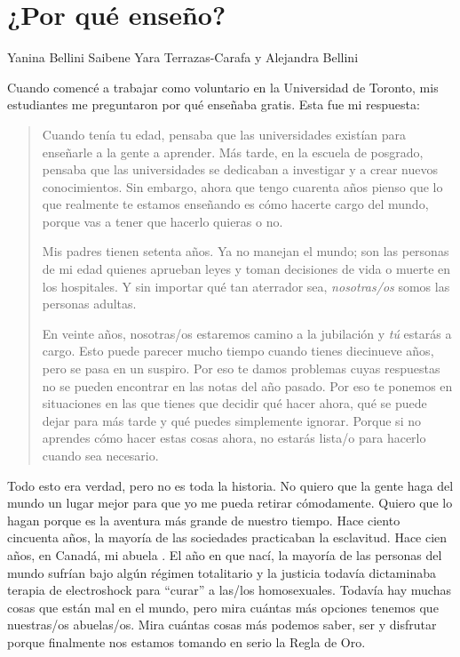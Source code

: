 \chapter{¿Por qué enseño?}\label{s:finale}

\begin{reviewer}
{Yanina Bellini Saibene}
{Yara Terrazas-Carafa y Alejandra Bellini}
\end{reviewer}

Cuando comencé a trabajar como voluntario en la Universidad de Toronto,
mis estudiantes me preguntaron por qué enseñaba gratis.
Esta fue mi respuesta:

\begin{quote}

Cuando tenía tu edad,
pensaba que las universidades existían para enseñarle a la gente a aprender.
Más tarde,
en la escuela de posgrado,
pensaba que las universidades se dedicaban a investigar y a crear nuevos conocimientos.
Sin embargo, ahora que tengo cuarenta años
pienso que lo que realmente te estamos enseñando es
cómo hacerte cargo del mundo,
porque vas a tener que hacerlo quieras o no.

Mis padres tienen setenta años.
Ya no manejan el mundo;
son las personas de mi edad quienes aprueban leyes
y toman decisiones de vida o muerte en los hospitales.
Y sin importar qué tan aterrador sea,
\emph{nosotras/os} somos las personas adultas.

En veinte años,
nosotras/os estaremos camino a la jubilación y \emph{tú} estarás a cargo.
Esto puede parecer mucho tiempo cuando tienes diecinueve años,
pero se pasa en un suspiro.
Por eso te damos problemas cuyas respuestas no se pueden encontrar en las notas del año pasado.
Por eso te ponemos en situaciones en las que 
tienes que decidir qué hacer ahora, 
qué se puede dejar para más tarde
y qué puedes simplemente ignorar.
Porque si no aprendes cómo hacer estas cosas ahora,
no estarás lista/o para hacerlo cuando sea necesario.

\end{quote}

Todo esto era verdad,
pero no es toda la historia.
No quiero que la gente haga del mundo un lugar mejor para que yo me pueda retirar cómodamente.
Quiero que lo hagan porque es la aventura más grande de nuestro tiempo.
Hace ciento cincuenta años,
la mayoría de las sociedades practicaban la esclavitud.
Hace cien años, en Canadá,
mi abuela .
El año en que nací,
la mayoría de las personas del mundo sufrían bajo algún régimen totalitario
y la justicia todavía dictaminaba terapia de electroshock para ``curar'' a las/los homosexuales.
Todavía hay muchas cosas que están mal en el mundo,
pero mira cuántas más opciones tenemos que nuestras/os abuelas/os. 
Mira cuántas cosas más podemos saber, ser y disfrutar
porque finalmente nos estamos tomando en serio la Regla de Oro.

